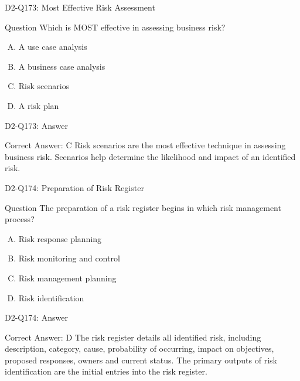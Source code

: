\documentclass{beamer}
\begin{document}
	\begin{frame}{D2-Q173: Most Effective Risk Assessment}
		\begin{block}{Question}
			Which is MOST effective in assessing business risk?
		\end{block}
		\begin{enumerate}[(A)]
			\item A use case analysis
			\item A business case analysis
			\item Risk scenarios
			\item A risk plan
		\end{enumerate}
	\end{frame}
	\begin{frame}{D2-Q173: Answer}
		\begin{block}{Correct Answer: C}
			Risk scenarios are the most effective technique in assessing business risk. Scenarios help determine the likelihood and impact of an identified risk.
		\end{block}
	\end{frame}
	
	\begin{frame}{D2-Q174: Preparation of Risk Register}
		\begin{block}{Question}
			The preparation of a risk register begins in which risk management process?
		\end{block}
		\begin{enumerate}[(A)]
			\item Risk response planning
			\item Risk monitoring and control
			\item Risk management planning
			\item Risk identification
		\end{enumerate}
	\end{frame}
	\begin{frame}{D2-Q174: Answer}
		\begin{block}{Correct Answer: D}
			The risk register details all identified risk, including description, category, cause, probability of occurring, impact on objectives, proposed responses, owners and current status. The primary outputs of risk identification are the initial entries into the risk register.
		\end{block}
	\end{frame}
	
\end{document}
